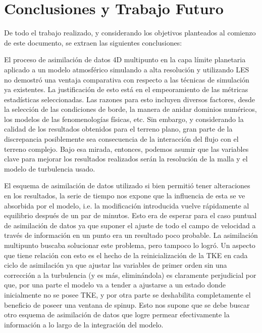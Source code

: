 \chapter{Conclusiones y Trabajo Futuro}
De todo el trabajo realizado, y considerando los objetivos planteados al comienzo de este documento, se extraen las siguientes conclusiones:

\begin{itemize*}
	\item El proceso de asimilación de datos 4D multipunto en la capa límite planetaria aplicado a un modelo atmosférico simulando a alta resolución y utilizando LES no demostró una ventaja comparativa con respecto a las técnicas de simulación ya existentes. La justificación de esto está en el empeoramiento de las métricas estadísticas seleccionadas. Las razones para esto incluyen diversos factores, desde la selección de las condiciones de borde, la manera de anidar dominios numéricos, los modelos de las fenomenologías físicas, etc. Sin embargo, y considerando la calidad de los resultados obtenidos para el terreno plano, gran parte de la discrepancia posiblemente sea consecuencia de la interacción del flujo con el terreno complejo. Bajo esa mirada, entonces, podemos asumir que las variables clave para mejorar los resultados realizados serán la resolución de la malla y el modelo de turbulencia usado.
	
	\item El esquema de asimilación de datos utilizado si bien permitió tener alteraciones en los resultados, la serie de tiempo nos expone que la influencia de esta se ve absorbida por el modelo, i.e. la modificación introducida vuelve rápidamente al equilibrio después de un par de minutos. Esto era de esperar para el caso puntual de asimilación de datos ya que suponer el ajuste de todo el campo de velocidad a través de información en un punto era un resultado poco probable. La asimilación multipunto buscaba solucionar este problema, pero tampoco lo logró. Un aspecto que tiene relación con esto es el hecho de la reinicialización de la TKE en cada ciclo de asimilación ya que ajustar las variables de primer orden sin una corrección a la turbulencia (y es más, eliminándola) es claramente perjudicial por que, por una parte el modelo va a tender a ajustarse a un estado donde inicialmente no se posee TKE, y por otra parte se deshabilita completamente el beneficio de poseer una ventana de spinup. Esto nos supone que se debe buscar otro esquema de asimilación de datos que logre permear efectivamente la información a lo largo de la integración del modelo.
	

\end{itemize*}
